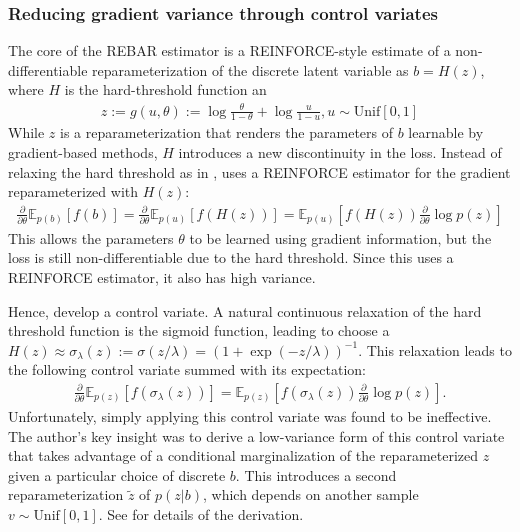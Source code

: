 \documentclass{article}
\begin{document}
\subsubsection{Reducing gradient variance through control variates}
The core of the REBAR estimator is a REINFORCE-style estimate of a non-differentiable reparameterization of the discrete latent variable as $b=H(z)$, where $H$ is the hard-threshold function an
\begin{align}
z := g(u, \theta) := \log\frac{\theta}{1-\theta} + \log\frac{u}{1-u}, u \sim \text{Unif}[0,1]
\end{align}
While $z$ is a reparameterization that renders the parameters of $b$ learnable by gradient-based methods, $H$ introduces a new discontinuity in the loss.
Instead of relaxing the hard threshold as in \cite{maddison2016concrete}, \cite{tucker2017rebar} uses a REINFORCE estimator for the gradient reparameterized with $H(z)$:
\begin{align}
    \frac{\partial}{\partial \theta} \mathbb{E}_{p(b)}[f(b)] = \frac{\partial}{\partial \theta} \mathbb{E}_{p(u)}[f(H(z))] = \mathbb{E}_{p(u)}[f(H(z))\frac{\partial}{\partial \theta}\log p(z)]
\end{align}
This allows the parameters $\theta$ to be learned using gradient information, but the loss is still non-differentiable due to the hard threshold.
Since this uses a REINFORCE estimator, it also has high variance.

Hence, \cite{tucker2017rebar} develop a control variate. A natural continuous relaxation of the hard threshold function is the sigmoid function, leading \cite{tucker2017rebar} to choose a $H(z) \approx \sigma_\lambda(z) := \sigma(z / \lambda) = (1+\exp( - z / \lambda))^{-1}$.
This relaxation leads to the following control variate summed with its expectation:
\begin{align}
    \frac{\partial}{\partial \theta} \mathbb{E}_{p(z)}[f(\sigma_\lambda(z))] =  \mathbb{E}_{p(z)}[f(\sigma_\lambda(z))\frac{\partial}{\partial \theta}\log p(z)].
\end{align}
Unfortunately, simply applying this control variate was found to be ineffective. 
The author's key insight was to derive a low-variance form of this control variate that takes advantage of a conditional marginalization of the reparameterized $z$ given a particular choice of discrete $b$.
This introduces a second reparameterization $\tilde{z}$ of $p(z|b)$, which depends on another sample $v\sim \text{Unif}[0,1]$.
See \cite{tucker2017rebar} for details of the derivation.
\end{document}
